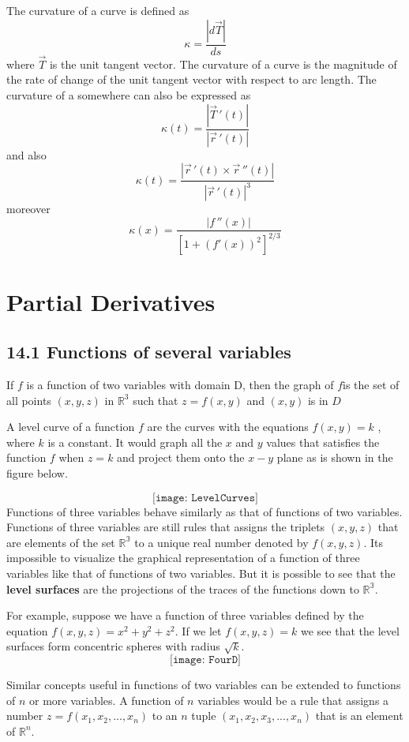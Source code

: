 \documentclass{article}
\begin{document}
	The curvature of a curve is defined as
	\[
		\kappa = \frac{|d\vec{T}|}{ds}
	\]
	where $\vec{T}$ is the unit tangent vector. The curvature of a curve is the
	magnitude of the rate of change of the unit tangent vector with respect to arc
	length. The curvature of a somewhere can also be expressed as
	\[
		\kappa(t) = \frac{|\vec{T}\,'(t)|}{|\vec{r}\,'(t)|}
	\]
	and also
	\[
		\kappa(t) = \frac{|\vec{r}\,'(t)\times \vec{r}\,''(t)|}{|\vec{r}\,'(t)|^{3}}
	\]
	moreover
	\[
		\kappa(x) = \frac{|f\,''(x)|}{[1+(f'(x))^{2}]^{2/3}}
	\]

	\section{Partial Derivatives}
	\subsection{14.1 Functions of several variables}

	If $f$ is a function of two variables with domain D, then the graph of $f$is the
	set of all points $(x,y,z)$ in $\mathbb{R}^{3}$ such that $z=f(x,y)$ and $(x,y)$
	is in $D$

	A level curve of a function $f$ are the curves with the equations $f(x,y) = k$
	, where $k$ is a constant. It would graph all the $x$ and $y$ values that satisfies
	the function $f$ when $z=k$ and project them onto the $x-y$ plane as is shown in
	the figure below.

	\[
		\texttt{[image: LevelCurves]}
	\]
	Functions of three variables behave similarly as that of functions of two variables.
	Functions of three variables are still rules that assigns the triplets
	$(x,y,z)$ that are elements of the set $\mathbb{R^3}$ to a unique real number
	denoted by $f(x,y,z)$. Its impossible to visualize the graphical representation
	of a function of three variables like that of functions of two variables. But
	it is possible to see that the \textbf{level surfaces} are the projections of the
	traces of the functions down to $\mathbb{R^3}$.

	For example, suppose we have a function of three variables defined by the
	equation $f(x,y,z) = x^{2}+y^{2}+z^{2}$. If we let $f(x,y,z) =k$ we see that the
	level surfaces form concentric spheres with radius $\sqrt{k}$.
	\[
		\texttt{[image: FourD]}
	\]

	Similar concepts useful in functions of two variables can be extended to functions
	of $n$ or more variables. A function of $n$ variables would be a rule that
	assigns a number $z=f(x_{1},x_{2},...,x_{n})$ to an $n$ tuple
	$(x_{1},x_{2},x_{3},...,x_{n})$ that is an element of $\mathbb{R}^{n}$.
\end{document}
